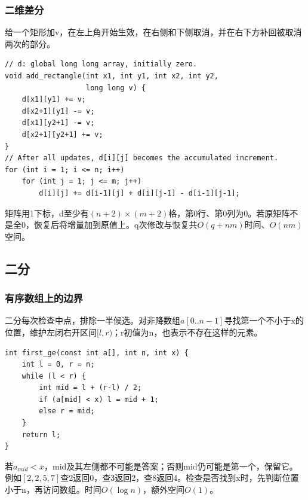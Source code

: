 \documentclass[UTF8,11pt,a4paper,fontset=none]{ctexart}
\begin{document}
\subsubsection{二维差分}
给一个矩形加v，在左上角开始生效，在右侧和下侧取消，并在右下方补回被取消两次的部分。
\par\noindent\begin{minipage}{\linewidth}
\begin{lstlisting}
// d: global long long array, initially zero.
void add_rectangle(int x1, int y1, int x2, int y2,
                   long long v) {
    d[x1][y1] += v;
    d[x2+1][y1] -= v;
    d[x1][y2+1] -= v;
    d[x2+1][y2+1] += v;
}
// After all updates, d[i][j] becomes the accumulated increment.
for (int i = 1; i <= n; i++)
    for (int j = 1; j <= m; j++)
        d[i][j] += d[i-1][j] + d[i][j-1] - d[i-1][j-1];
\end{lstlisting}
\end{minipage}\par
矩阵用1下标，d至少有$(n+2)\times(m+2)$格，第0行、第0列为0。若原矩阵不是全0，恢复后将增量加到原值上。q次修改与恢复共$O(q+nm)$时间、$O(nm)$空间。

\subsection{二分}
\subsubsection{有序数组上的边界}
二分每次检查中点，排除一半候选。对非降数组$a[0..n-1]$寻找第一个不小于x的位置，维护左闭右开区间$[l,r)$；r初值为n，也表示不存在这样的元素。
\par\noindent\begin{minipage}{\linewidth}
\begin{lstlisting}
int first_ge(const int a[], int n, int x) {
    int l = 0, r = n;
    while (l < r) {
        int mid = l + (r-l) / 2;
        if (a[mid] < x) l = mid + 1;
        else r = mid;
    }
    return l;
}
\end{lstlisting}
\end{minipage}\par
若$a_{mid}<x$，mid及其左侧都不可能是答案；否则mid仍可能是第一个，保留它。例如$[2,2,5,7]$查2返回0，查3返回2，查8返回4。检查是否找到x时，先判断位置小于n，再访问数组。时间$O(\log n)$，额外空间$O(1)$。
\end{document}
